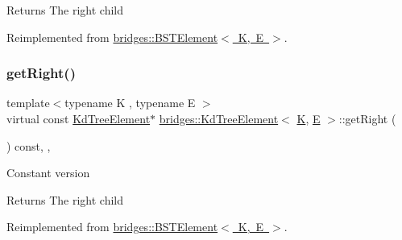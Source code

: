 \begin{DoxyReturn}{Returns}
The right child 
\end{DoxyReturn}


Reimplemented from \mbox{\hyperlink{classbridges_1_1_b_s_t_element_a35e93bce32de933522dccde5f2b5ffd9}{bridges\+::\+B\+S\+T\+Element$<$ K, E $>$}}.

\mbox{\label{classbridges_1_1_kd_tree_element_a48e6a81eccf6d156e50865ef8066be82}} 
\subsubsection{\texorpdfstring{getRight()}{getRight()}\hspace{0.1cm}{\footnotesize\ttfamily [2/2]}}
{\footnotesize\ttfamily template$<$typename K , typename E $>$ \\
virtual const \mbox{\hyperlink{classbridges_1_1_kd_tree_element}{Kd\+Tree\+Element}}$\ast$ \mbox{\hyperlink{classbridges_1_1_kd_tree_element}{bridges\+::\+Kd\+Tree\+Element}}$<$ \mbox{\hyperlink{namespacebridges_acfb0a4f7877d8f63de3e6862004c50edaa5f3c6a11b03839d46af9fb43c97c188}{K}}, \mbox{\hyperlink{namespacebridges_acfb0a4f7877d8f63de3e6862004c50eda3a3ea00cfc35332cedf6e5e9a32e94da}{E}} $>$\+::get\+Right (\begin{DoxyParamCaption}{ }\end{DoxyParamCaption}) const\hspace{0.3cm}{\ttfamily [inline]}, {\ttfamily [override]}, {\ttfamily [virtual]}}

Constant version

\begin{DoxyReturn}{Returns}
The right child 
\end{DoxyReturn}


Reimplemented from \mbox{\hyperlink{classbridges_1_1_b_s_t_element_ae4e7b750eada97074a42e7f54b320a29}{bridges\+::\+B\+S\+T\+Element$<$ K, E $>$}}.

\mbox{\label{classbridges_1_1_kd_tree_element_a8c2c8503d8c8aa0db31fa834dffb60b0}} 
